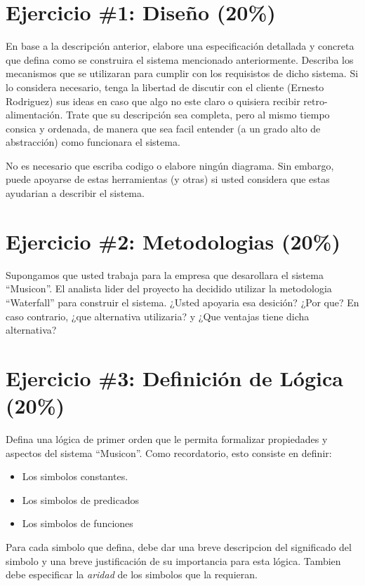 \documentclass{article}
\begin{document}
\section*{Ejercicio \#1: Dise\~no (20\%)}
En base a la descripci\'on anterior, elabore una especificaci\'on detallada y concreta
que defina como se construira el sistema mencionado anteriormente. Describa los mecanismos
que se utilizaran para cumplir con los requisistos de dicho sistema. Si lo considera
necesario, tenga la libertad de discutir con el cliente (Ernesto Rodriguez) sus ideas
en caso que algo no este claro o quisiera recibir retro-alimentaci\'on. Trate que su
descripci\'on sea completa, pero al mismo tiempo consica y ordenada, de manera que sea
facil entender (a un grado alto de abstracci\'on) como funcionara el sistema.

No es necesario que escriba codigo o elabore ning\'un diagrama. Sin embargo, puede apoyarse
de estas herramientas (y otras) si usted considera que estas ayudarian a describir el
sistema.

\section*{Ejercicio \#2: Metodologias (20\%)}
Supongamos que usted trabaja para la empresa que desarollara el sistema ``Musicon''.
El analista lider del proyecto ha decidido utilizar la metodologia ``Waterfall'' para
construir el sistema. ¿Usted apoyaria esa desici\'on? ¿Por que? En caso contrario,
¿que alternativa utilizaria? y ¿Que ventajas tiene dicha alternativa?

\section*{Ejercicio \#3: Definici\'on de L\'ogica (20\%)}
Defina una l\'ogica de primer orden\cite{FLL} que le permita formalizar propiedades y aspectos
del sistema ``Musicon''. Como recordatorio, esto consiste en definir:
\begin{itemize}
        \item Los simbolos constantes.
        \item Los simbolos de predicados
        \item Los simbolos de funciones
\end{itemize}
Para cada simbolo que defina, debe dar una breve descripcion del significado del simbolo
y una breve justificaci\'on de su importancia para esta l\'ogica. Tambien debe especificar
la \emph{aridad} de los simbolos que la requieran.
\end{document}
